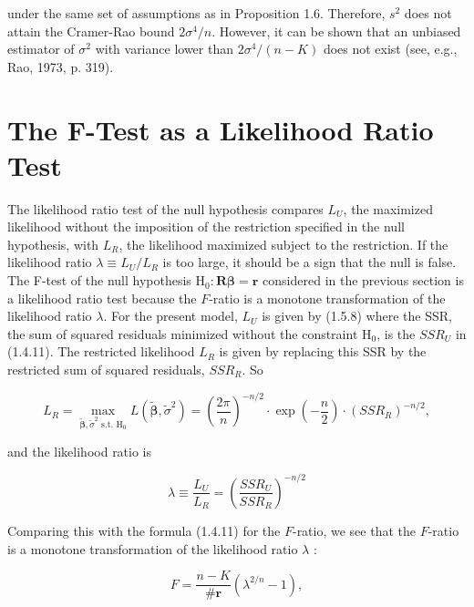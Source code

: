 \documentclass[10pt]{article}
\begin{document}
under the same set of assumptions as in Proposition 1.6. Therefore, $s^{2}$ does not attain the Cramer-Rao bound $2 \sigma^{4} / n$. However, it can be shown that an unbiased estimator of $\sigma^{2}$ with variance lower than $2 \sigma^{4} /(n-K)$ does not exist (see, e.g., Rao, 1973, p. 319).

\section*{The $\boldsymbol{F}$-Test as a Likelihood Ratio Test}
The likelihood ratio test of the null hypothesis compares $L_{U}$, the maximized likelihood without the imposition of the restriction specified in the null hypothesis, with $L_{R}$, the likelihood maximized subject to the restriction. If the likelihood ratio $\lambda \equiv L_{U} / L_{R}$ is too large, it should be a sign that the null is false. The F-test of the null hypothesis $\mathrm{H}_{0}: \mathbf{R} \boldsymbol{\beta}=\mathbf{r}$ considered in the previous section is a likelihood ratio test because the $F$-ratio is a monotone transformation of the likelihood ratio $\lambda$. For the present model, $L_{U}$ is given by (1.5.8) where the SSR, the sum of squared residuals minimized without the constraint $\mathrm{H}_{0}$, is the $S S R_{U}$ in (1.4.11). The restricted likelihood $L_{R}$ is given by replacing this SSR by the restricted sum of squared residuals, $S S R_{R}$. So


\begin{equation*}
L_{R}=\max _{\widetilde{\boldsymbol{\beta}}, \tilde{\sigma}^{2} \text { s.t. } \mathrm{H}_{0}} L\left(\widetilde{\boldsymbol{\beta}}, \tilde{\sigma}^{2}\right)=\left(\frac{2 \pi}{n}\right)^{-n / 2} \cdot \exp \left(-\frac{n}{2}\right) \cdot\left(S S R_{R}\right)^{-n / 2}, \tag{1.5.17}
\end{equation*}


and the likelihood ratio is


\begin{equation*}
\lambda \equiv \frac{L_{U}}{L_{R}}=\left(\frac{S S R_{U}}{S S R_{R}}\right)^{-n / 2} \tag{1.5.18}
\end{equation*}


Comparing this with the formula (1.4.11) for the $F$-ratio, we see that the $F$-ratio is a monotone transformation of the likelihood ratio $\lambda$ :


\begin{equation*}
F=\frac{n-K}{\# \mathbf{r}}\left(\lambda^{2 / n}-1\right), \tag{1.5.19}
\end{equation*}
\end{document}
